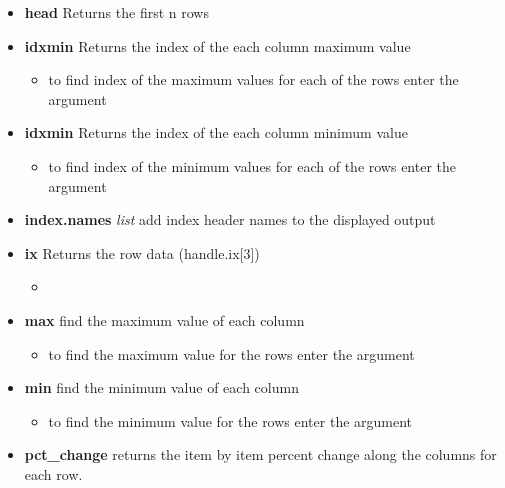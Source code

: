 \begin{itemize}
  \item \textbf{head} Returns the first n rows

  \item \textbf{idxmin} Returns the index of the each column maximum value
    \begin{itemize}

      \item to find index of the maximum values for each of the rows enter
        the argument \color{red}{axis=1}
    \end{itemize}

  \item \textbf{idxmin} Returns the index of the each column minimum value
    \begin{itemize}

      \item to find index of the minimum values for each of the rows enter
        the argument \color{red}{axis=1}
    \end{itemize}

  \item \textbf{index.names} \textit{list} add index header names to the
    displayed output

  \item \textbf{ix} Returns the row data (handle.ix[3])
    \begin{itemize}

      \item \color{red}{if additional rows and columns are added using this
        command it will have the same effect as calling reindex.}
    \end{itemize}

  \item \textbf{max} find the maximum value of each column
    \begin{itemize}

      \item to find the maximum value for the rows enter the argument
        \color{red}{axis=1}
    \end{itemize}

  \item \textbf{min} find the minimum value of each column
    \begin{itemize}

      \item to find the minimum value for the rows enter the argument
        \color{red}{axis=1}
    \end{itemize}

  \item \textbf{pct\_change} returns the item by item percent change along the
    columns for each row.
    \begin{itemize}


\end{itemize}
\end{itemize}
